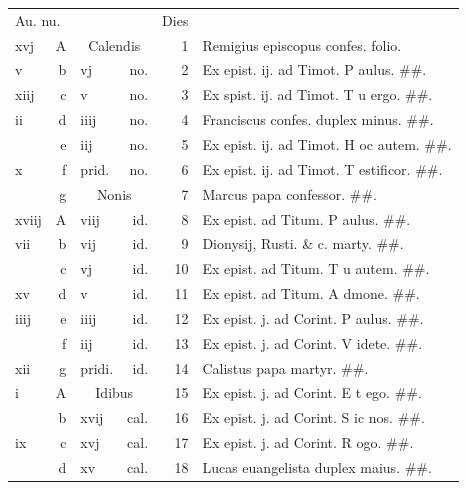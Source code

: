 \documentclass[a5paper,10pt]{book}
\begin{document}
\begin{center}
\begin{tabular}{l r l r r l}
\multicolumn{2}{l}{\color{red}Au. nu.} & & & \color{red} Dies & \\
xvj & \color{red} A & \multicolumn{2}{c}{\color{red} Calendis} & 1 & Remigius episcopus confes. folio. \\
v & b & vj & no. & 2 & Ex epist. ij. ad Timot. \color{red} P\color{black} aulus. \#\#.\\
xiij & c & v & no. & 3 & Ex spist. ij. ad Timot. \color{red} T\color{black} u ergo. \#\#.\\
ii & d & iiij & no. & 4 & \color{red} Franciscus confes. duplex minus. \color{black} \#\#.\\
 & e & iij & no. & 5 & Ex epist. ij. ad Timot. \color{red} H\color{black} oc autem. \#\#.\\
x & f & \color{red} prid. & no. & 6 & Ex epist. ij. ad Timot. \color{red} T\color{black} estificor. \#\#.\\
 & g & \multicolumn{2}{c}{\color{red} Nonis} & 7 & Marcus papa confessor. \color{black} \#\#.\\
xviij & \color{red} A & viij & id. & 8 & Ex epist. ad Titum. \color{red} P\color{black} aulus. \#\#.\\
vii & b & vij & id. & 9 & Dionysij, Rusti. \& c. marty. \color{black} \#\#.\\
 & c & vj & id. & 10 & Ex epist. ad Titum. \color{red} T\color{black} u autem. \#\#.\\
xv & d & v & id. & 11 & Ex epist. ad Titum. A\color{black} dmone. \#\#.\\%
iiij & e & iiij & id. & 12 & Ex epist. j. ad Corint. \color{red} P\color{black} aulus. \#\#.\\
 & f & iij & id. & 13 & Ex epist. j. ad Corint. \color{red} V\color{black} idete. \#\#.\\
xii & g & \color{red} pridi. & id. & 14 & Calistus papa martyr. \#\#.\\
i & \color{red} A & \multicolumn{2}{c}{\color{red} Idibus} & 15 & Ex epist. j. ad Corint. \color{red} E\color{black} t ego. \#\#.\\
 & b & xvij & cal. & 16 & Ex epist. j. ad Corint. \color{red} S\color{black} ic nos. \#\#.\\
ix & c & xvj & cal. & 17 & Ex epist. j. ad Corint. \color{red} R\color{black} ogo. \#\#.\\
 & d & xv & cal. & 18 & \color{red} Lucas euangelista duplex maius. \color{black} \#\#.\\

\end{tabular}
\end{center}
\end{document}
